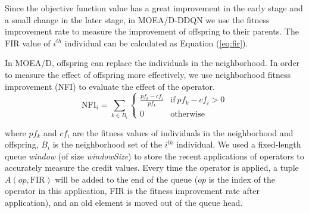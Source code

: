 \documentclass[journal]{IEEEtran}
\newcommand{\TODO}[1]{\textcolor[rgb]{1.00,0.40,0.22}{#1}}
\begin{document}
Since the objective function value has a great improvement in the early stage and a small change in the later stage, in MOEA/D-DDQN we use the fitness improvement rate to measure the improvement of offspring to their parents.
The FIR value of $i^{th}$ individual can be calculated as Equation (\ref{eq:fir}).


In MOEA/D, offspring can replace the individuals in the neighborhood. In order to measure the effect of offspring more effectively, we use neighborhood fitness improvement (NFI) to evaluate the effect of the operator.
\begin{equation}
  \text{NFI}_{i}= \sum_{k \in B_i}
  \left\{
  \begin{array}{ll}
    \frac{pf_{k}-cf_{i}}{pf_{k}} & \text{if}\ pf_{k}-cf_{i}>0 \\

    0                            & \text{otherwise}
  \end{array}
  \right.
  \label{eq:nfi}
\end{equation}

where $pf_{k}$ and $cf_{i}$ are the fitness values of individuals in the neighborhood and offspring, $B_i$ is the neighborhood set of the $i^{th}$ individual.
% 
We used a fixed-length queue \textit{window} (of size \textit{windowSize}) to store the recent applications of operators to accurately measure the credit values.
Every time the operator is applied, a tuple $A (op, \text{FIR})$ will be added to the end of the queue ($op$ is the index of the operator in this application, FIR is the fitness improvement rate after application), and an old element is moved out of the queue head.
\end{document}
